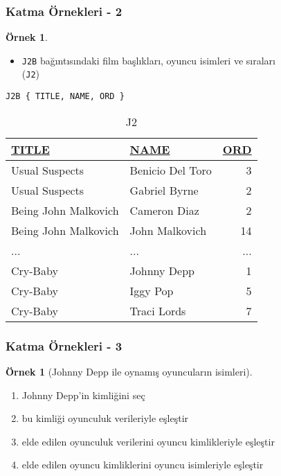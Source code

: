 \documentclass[dvipsnames]{beamer}
\theoremstyle{definition}
\theoremstyle{example}
\newtheorem{ornek}[theorem]{Örnek}
\theoremstyle{plain}
\begin{document}
\begin{frame}[fragile]
  \frametitle{Katma Örnekleri - 2}

  \begin{ornek}
    \begin{itemize}
      \item \texttt{J2B} bağıntısındaki film başlıkları, oyuncu isimleri
        ve sıraları\\
        (\texttt{J2})
    \end{itemize}

    \begin{lstlisting}
J2B { TITLE, NAME, ORD }
    \end{lstlisting}

    \pause
    \vspace{-10pt}
    \begin{tiny}
    \begin{table}
      \caption{J2}
      \begin{tabular}{|l|l|r|}\hline
\underline{TITLE}    & \underline{NAME} & \underline{ORD}\\[2pt]\hline\hline
Usual Suspects       & Benicio Del Toro &   3\\\hline
Usual Suspects       & Gabriel Byrne    &   2\\\hline
Being John Malkovich & Cameron Diaz     &   2\\\hline
Being John Malkovich & John Malkovich   &  14\\\hline
...                  & ...              & ...\\\hline
Cry-Baby             & Johnny Depp      &   1\\\hline
Cry-Baby             & Iggy Pop         &   5\\\hline
Cry-Baby             & Traci Lords      &   7\\\hline
      \end{tabular}
    \end{table}
    \end{tiny}
  \end{ornek}
\end{frame}

\begin{frame}
  \frametitle{Katma Örnekleri - 3}

  \begin{ornek}[Johnny Depp ile oynamış oyuncuların isimleri]
    \pause
    \begin{enumerate}
      \item Johnny Depp'in kimliğini seç

      \pause
      \item bu kimliği oyunculuk verileriyle eşleştir

      \pause
      \item elde edilen oyunculuk verilerini oyuncu kimlikleriyle eşleştir

      \pause
      \item elde edilen oyuncu kimliklerini oyuncu isimleriyle eşleştir
    \end{enumerate}
  \end{ornek}
\end{frame}
\end{document}
